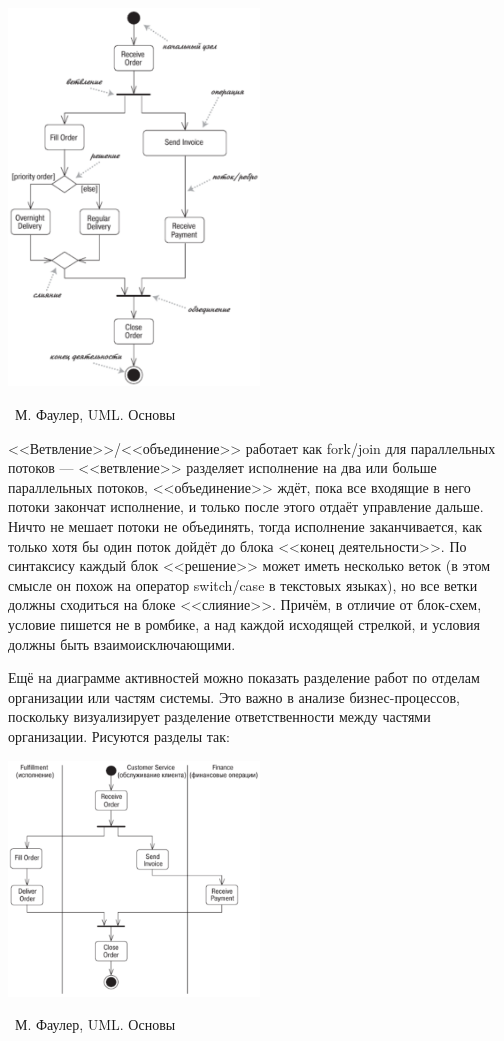 \documentclass[a5paper]{article}
\newcommand{\attribution}[1] {
    \vspace{-4mm}\begin{flushright}\begin{scriptsize}%
    {\textcopyright\, #1}\end{scriptsize}\end{flushright}
}
\begin{document}
\begin{center}
    \includegraphics[width=0.5\textwidth]{activityDiagram.png}
    \attribution{М. Фаулер, UML. Основы}
\end{center}

<<Ветвление>>/<<объединение>> работает как fork/join для параллельных потоков --- <<ветвление>> разделяет исполнение на два или больше параллельных потоков, <<объединение>> ждёт, пока все входящие в него потоки закончат исполнение, и только после этого отдаёт управление дальше. Ничто не мешает потоки не объединять, тогда исполнение заканчивается, как только хотя бы один поток дойдёт до блока <<конец деятельности>>. По синтаксису каждый блок <<решение>> может иметь несколько веток (в этом смысле он похож на оператор switch/case в текстовых языках), но все ветки должны сходиться на блоке <<слияние>>. Причём, в отличие от блок-схем, условие пишется не в ромбике, а над каждой исходящей стрелкой, и условия должны быть взаимоисключающими.

Ещё на диаграмме активностей можно показать разделение работ по отделам организации или частям системы. Это важно в анализе бизнес-процессов, поскольку визуализирует разделение ответственности между частями организации. Рисуются разделы так:

\begin{center}
    \includegraphics[width=0.5\textwidth]{activitySwimlanes.png}
    \attribution{М. Фаулер, UML. Основы}
\end{center}
\end{document}
